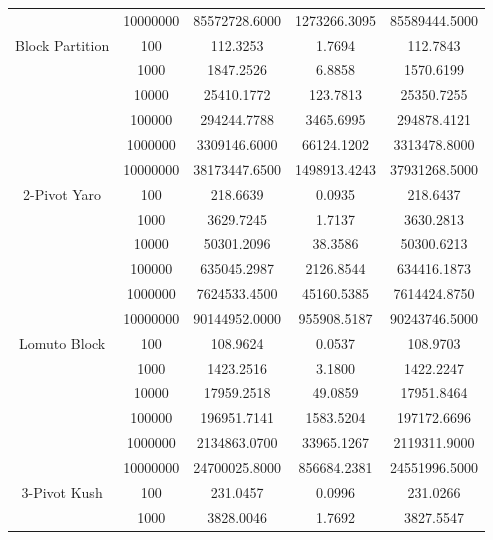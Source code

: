 \documentclass{article}
\begin{document}
\begin{center}
\begin{tabular}{ |c c | c c c| }
                        & 10000000 & 85572728.6000  & 1273266.3095  & 85589444.5000 \\
        Block Partition & 100      & 112.3253       & 1.7694        & 112.7843 \\
                        & 1000     & 1847.2526      & 6.8858        & 1570.6199 \\
                        & 10000    & 25410.1772     & 123.7813      & 25350.7255 \\
                        & 100000   & 294244.7788    & 3465.6995     & 294878.4121 \\
                        & 1000000  & 3309146.6000   & 66124.1202    & 3313478.8000 \\
                        & 10000000 & 38173447.6500  & 1498913.4243  & 37931268.5000 \\
        \hline
        2-Pivot Yaro    & 100      & 218.6639       & 0.0935        & 218.6437 \\
                        & 1000     & 3629.7245      & 1.7137        & 3630.2813 \\
                        & 10000    & 50301.2096     & 38.3586       & 50300.6213 \\
                        & 100000   & 635045.2987    & 2126.8544     & 634416.1873 \\
                        & 1000000  & 7624533.4500   & 45160.5385    & 7614424.8750 \\
                        & 10000000 & 90144952.0000  & 955908.5187   & 90243746.5000 \\
        Lomuto Block    & 100      & 108.9624       & 0.0537        & 108.9703 \\
                        & 1000     & 1423.2516      & 3.1800        & 1422.2247 \\
                        & 10000    & 17959.2518     & 49.0859       & 17951.8464 \\
                        & 100000   & 196951.7141    & 1583.5204     & 197172.6696 \\
                        & 1000000  & 2134863.0700   & 33965.1267    & 2119311.9000 \\
                        & 10000000 & 24700025.8000  & 856684.2381   & 24551996.5000 \\
        \hline
        3-Pivot Kush    & 100      & 231.0457       & 0.0996        & 231.0266 \\
                        & 1000     & 3828.0046      & 1.7692        & 3827.5547 \\

\end{tabular}
\end{center}
\end{document}

